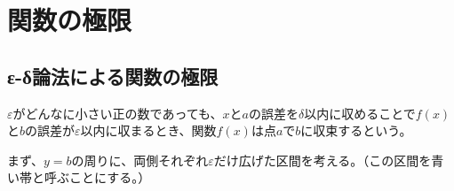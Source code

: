 \documentclass[../../math-imaging]{subfiles}
\begin{document}
\section{関数の極限}

\subsection{ε-δ論法による関数の極限}

$\varepsilon$がどんなに小さい正の数であっても、$x$と$a$の誤差を$\delta$以内に収めることで$f(x)$と$b$の誤差が$\varepsilon$以内に収まるとき、関数$f(x)$は点$a$で$b$に収束するという。

\froufrou

まず、$y=b$の周りに、両側それぞれ$\varepsilon$だけ広げた区間を考える。（この区間を青い帯と呼ぶことにする。）
\end{document}
